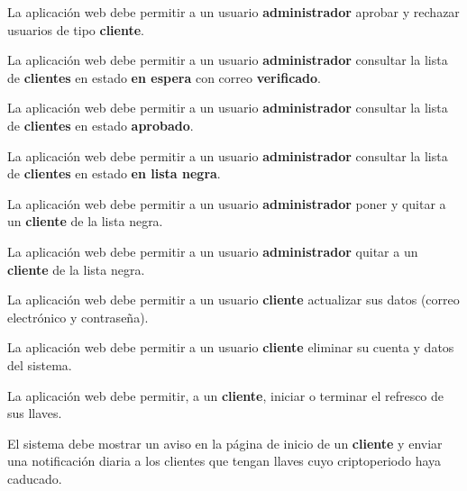 {
  La aplicación web debe permitir a un usuario \textbf{administrador} aprobar
  y rechazar usuarios de tipo \textbf{cliente}.
}

{
  La aplicación web debe permitir a un usuario \textbf{administrador} consultar
  la lista de \textbf{clientes} en estado \textbf{en espera} con correo
  \textbf{verificado}.
}

{
  La aplicación web debe permitir a un usuario \textbf{administrador} consultar
  la lista de \textbf{clientes} en estado \textbf{aprobado}.
}

{
  La aplicación web debe permitir a un usuario \textbf{administrador} consultar
  la lista de \textbf{clientes} en estado \textbf{en lista negra}.
}

{
  La aplicación web debe permitir a un usuario \textbf{administrador} poner y
  quitar a un \textbf{cliente} de la lista negra.
}

{
  La aplicación web debe permitir a un usuario \textbf{administrador} quitar a
  un \textbf{cliente} de la lista negra.
}

{
  La aplicación web debe permitir a un usuario \textbf{cliente} actualizar sus
  datos (correo electrónico y contraseña).
}

{
  La aplicación web debe permitir a un usuario \textbf{cliente} eliminar su
  cuenta y datos del sistema.
}

{
  La aplicación web debe permitir, a un \textbf{cliente}, iniciar o terminar el
  refresco de sus llaves.
}

{
  El sistema debe mostrar un aviso en la página de inicio de un \textbf{cliente}
  y enviar una notificación diaria a los clientes que tengan llaves cuyo
  criptoperiodo haya caducado.
}


